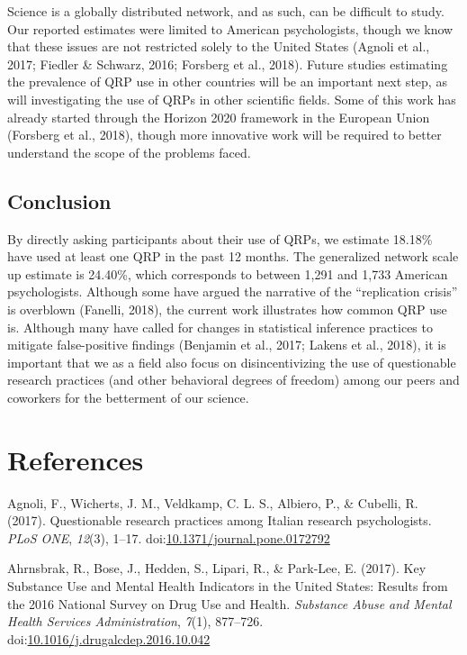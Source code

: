 \documentclass[jou]{apa6}
\theoremstyle{definition}
\theoremstyle{definition}
\theoremstyle{definition}
\theoremstyle{remark}
\begin{document}
Science is a globally distributed network, and as such, can be difficult
to study. Our reported estimates were limited to American psychologists,
though we know that these issues are not restricted solely to the United
States (Agnoli et al., 2017; Fiedler \& Schwarz, 2016; Forsberg et al.,
2018). Future studies estimating the prevalence of QRP use in other
countries will be an important next step, as will investigating the use
of QRPs in other scientific fields. Some of this work has already
started through the Horizon 2020 framework in the European Union
(Forsberg et al., 2018), though more innovative work will be required to
better understand the scope of the problems faced.

\subsection{Conclusion}\label{conclusion}

By directly asking participants about their use of QRPs, we estimate
18.18\% have used at least one QRP in the past 12 months. The
generalized network scale up estimate is 24.40\%, which corresponds to
between 1,291 and 1,733 American psychologists. Although some have
argued the narrative of the \enquote{replication crisis} is overblown
(Fanelli, 2018), the current work illustrates how common QRP use is.
Although many have called for changes in statistical inference practices
to mitigate false-positive findings (Benjamin et al., 2017; Lakens et
al., 2018), it is important that we as a field also focus on
disincentivizing the use of questionable research practices (and other
behavioral degrees of freedom) among our peers and coworkers for the
betterment of our science.

\newpage

\section{References}\label{references}

\begingroup
\setlength{\parindent}{-0.5in} \setlength{\leftskip}{0.5in}

\hypertarget{refs}{}
\hypertarget{ref-Agnoli2017}{}
Agnoli, F., Wicherts, J. M., Veldkamp, C. L. S., Albiero, P., \&
Cubelli, R. (2017). Questionable research practices among Italian
research psychologists. \emph{PLoS ONE}, \emph{12}(3), 1--17.
doi:\href{https://doi.org/10.1371/journal.pone.0172792}{10.1371/journal.pone.0172792}

\hypertarget{ref-Ahrnsbrak2017}{}
Ahrnsbrak, R., Bose, J., Hedden, S., Lipari, R., \& Park-Lee, E. (2017).
Key Substance Use and Mental Health Indicators in the United States:
Results from the 2016 National Survey on Drug Use and Health.
\emph{Substance Abuse and Mental Health Services Administration},
\emph{7}(1), 877--726.
doi:\href{https://doi.org/10.1016/j.drugalcdep.2016.10.042}{10.1016/j.drugalcdep.2016.10.042}
\end{document}
